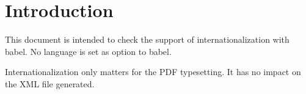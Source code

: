 \documentclass{article}
\begin{document}
\section*{Introduction}
This document is intended to check the support of internationalization with 
\textsf{babel}. No language is set as option to \textsf{babel}.

Internationalization only matters for the PDF typesetting. It has no impact on 
the XML file generated.

\def\do#1{
\begin{otherlanguage}{#1}
\begin{quiz}{#1}
\begin{description}[tags={#1}]{Description}Text\end{description}
\begin{cloze}{Cloze}
\begin{multi}[shuffle]{Multichoice}?\item* A\item B\end{multi}
\begin{multi}[multiple,shuffle=false]{Multianswer}?\item* A\item B\end{multi}
\begin{numerical}{Numerical}?\item0\end{numerical}
\begin{shortanswer}[usecase]{Shortanswer}?\item0\end{shortanswer}
\begin{shortanswer}[usecase=false]{Shortanswer}?\item0\end{shortanswer}
\end{cloze}
\begin{essay}[template={Default}]{Essay}Text\item Info\end{essay}
\begin{essay}[response format=html+file]{Essay}Text\end{essay}
\begin{essay}[response format=text]{Essay}Text\end{essay}
\begin{essay}[response format=monospaced]{Essay}Text\end{essay}
\begin{essay}[response format=file]{Essay}Text\end{essay}
\begin{matching}[dd]{Matching}?\item A\answer1\item B\answer2\item 

\end{matching}
\end{quiz}
\end{otherlanguage}}
\end{document}
